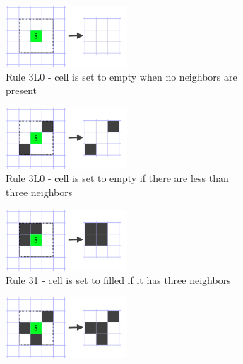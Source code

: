 \documentclass[12pt]{report}
\begin{document}
\begin{figure}[H]
	\centering
	\begin{subfigure}[t]{0.4\textwidth}
		\centering
		\includegraphics[width=0.5\textwidth]{images/rule0dead}
		\caption{Rule 3L0 - cell is set to empty when no neighbors are present} 
	\end{subfigure} \hspace{1em}
	\begin{subfigure}[t]{0.4\textwidth}
		\centering
		\includegraphics[width=0.5\textwidth]{images/rule2dead}
		\caption{Rule 3L0 - cell is set to empty if there are less than three neighbors} 
	\end{subfigure} \hspace{1em} 
	\begin{subfigure}[t]{0.4\textwidth}
		\centering
		\includegraphics[width=0.5\textwidth]{images/rule3alive}
		\caption{Rule 31 - cell is set to filled if it has three neighbors} 
	\end{subfigure} \hspace{1em} 
	\begin{subfigure}[t]{0.4\textwidth}
		\centering
		\includegraphics[width=0.5\textwidth]{images/rule3alive2}

\end{subfigure}
\end{figure}
\end{document}
